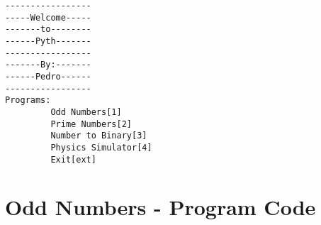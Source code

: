 \documentclass{tufte-handout}
\begin{document}
\begin{shaded}
\begin{verbatim}
-----------------
-----Welcome-----
-------to--------
------Pyth-------
-----------------
-------By:-------
------Pedro------
-----------------
Programs:
         Odd Numbers[1]
         Prime Numbers[2]
         Number to Binary[3]
         Physics Simulator[4]
         Exit[ext]
\end{verbatim}
\end{shaded}

\vspace{1cm}

\newpage

\section{Odd Numbers - Program Code}
\end{document}
